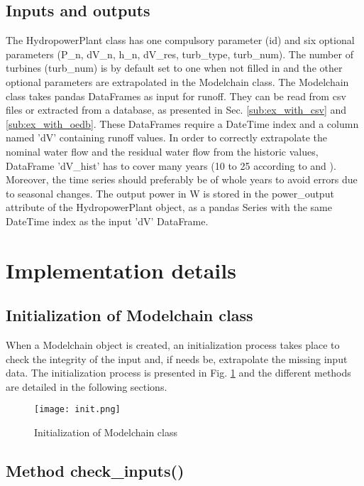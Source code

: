 \subsection{Inputs and outputs}

The HydropowerPlant class has one compulsory parameter (id) and six optional parameters (P{\_}n, dV{\_}n, h{\_}n, dV{\_}res, turb{\_}type, turb{\_}num). The number of turbines (turb{\_}num) is by default set to one when not filled in and the other optional parameters are extrapolated in the Modelchain class. \newline 
The Modelchain class takes pandas DataFrames as input for runoff. They can be read from csv files or extracted from a database, as presented in Sec. \ref{sub:ex_with_csv} and \ref{sub:ex_with_oedb}. These DataFrames require a DateTime index and a column named 'dV' containing runoff values. In order to correctly extrapolate the nominal water flow and the residual water flow from the historic values, DataFrame 'dV{\_}hist' has to cover many years (10 to 25 according to \cite{pacer} and \cite{cetmef}). Moreover, the time series should preferably be of whole years to avoid errors due to seasonal changes. \newline
The output power in \unit{W} is stored in the power{\_}output attribute of the HydropowerPlant object, as a pandas Series with the same DateTime index as the input 'dV' DataFrame.

\section{Implementation details}

\subsection{Initialization of Modelchain class}

When a Modelchain object is created, an initialization process takes place to check the integrity of the input and, if needs be, extrapolate the missing input data. The initialization process is presented in Fig. \ref{init} and the different methods are detailed in the following sections.

\begin{figure}[h]
\centering
\texttt{[image: init.png]}
\caption{Initialization of Modelchain class}
\label{init}
\end{figure}

\subsection{Method check{\_}inputs()}
\label{sub:check_feas}

